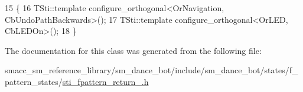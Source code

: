 \begin{DoxyCode}
15   \{
16     TSti::template configure\_orthogonal<OrNavigation, CbUndoPathBackwards>();
17     TSti::template configure\_orthogonal<OrLED, CbLEDOn>();
18   \}
\end{DoxyCode}


The documentation for this class was generated from the following file\+:\begin{DoxyCompactItemize}
\item 
smacc\+\_\+sm\+\_\+reference\+\_\+library/sm\+\_\+dance\+\_\+bot/include/sm\+\_\+dance\+\_\+bot/states/f\+\_\+pattern\+\_\+states/\hyperlink{include_2sm__dance__bot_2states_2f__pattern__states_2sti__fpattern__return__1_8h}{sti\+\_\+fpattern\+\_\+return\+\_.\+h}\end{DoxyCompactItemize}
